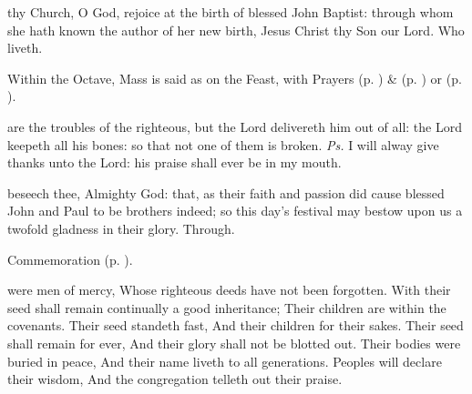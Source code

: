 
\postcommunion\label{JohnBaptistPC}
 thy Church, O God, rejoice at the birth of blessed John Baptist: through whom she hath known the author of her new birth, Jesus Christ thy Son our Lord. Who liveth.

\begin{rubric}
    Within the Octave, Mass is said as on the Feast, with  Prayers  (p. \pageref{SPMaryInEaster}) \&   (p. \pageref{SPAgainst}) or  (p. \pageref{SPChiefBishop}).
\end{rubric}



\introit
{} are the troubles of the righteous, but the Lord delivereth him out of all: the Lord keepeth all his bones: so that not one of them is broken. \textit{Ps.} I will alway give thanks unto the Lord: his praise shall ever be in my mouth.

\collect
{} beseech thee, Almighty God: that, as their faith and passion did cause blessed John and Paul to be brothers indeed; so this day's festival may bestow upon us a twofold gladness in their glory. Through.

\begin{rubric}
	Commemoration  (p. \pageref{JohnBaptistCollect}).
\end{rubric}

 were men of mercy, Whose righteous deeds have not been forgotten. With their seed shall remain continually a good inheritance; Their children are within the covenants. Their seed standeth fast, And their children for their sakes. Their seed shall remain for ever, And their glory shall not be blotted out. Their bodies were buried in peace, And their name liveth to all generations. Peoples will declare their wisdom, And the congregation telleth out their praise. 


